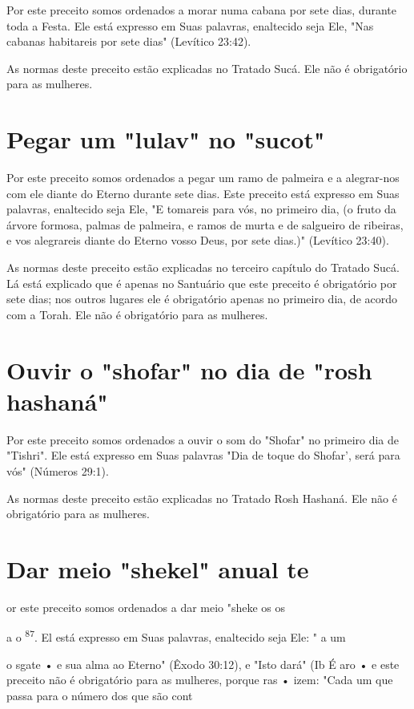 \begin{itemize}
\begin{enumrate}
\begin{itemize}
\begin{itemize}
\begin{itemize}
Por este preceito somos ordenados a morar numa cabana por sete dias,
durante toda a Festa. Ele está expresso em Suas palavras, enaltecido
seja Ele, "Nas cabanas habitareis por sete dias" (Levítico 23:42).

As normas deste preceito estão explicadas no Tratado Sucá. Ele não é
obrigatório para as mulheres.

\section{Pegar um "lulav" no "sucot"}

Por este preceito somos ordenados a pegar um ramo de palmeira e a
alegrar-nos com ele diante do Eterno durante sete dias. Este preceito
está ex­presso em Suas palavras, enaltecido seja Ele, "E tomareis para
vós, no primeiro dia, (o fruto da árvore formosa, palmas de palmeira, e
ramos de murta e de sal­gueiro de ribeiras, e vos alegrareis diante do
Eterno vosso Deus, por sete dias.)" (Levítico 23:40).

As normas deste preceito estão explicadas no terceiro capítulo do
Tratado Sucá. Lá está explicado que é apenas no Santuário que este
preceito é obrigatório por sete dias; nos outros lugares ele é
obrigatório apenas no pri­meiro dia, de acordo com a Torah. Ele não é
obrigatório para as mulheres.

\section{Ouvir o "shofar" no dia de "rosh hashaná"}

Por este preceito somos ordenados a ouvir o som do "Shofar" no primeiro
dia de "Tishri". Ele está expresso em Suas palavras "Dia de toque do
Shofar', será para vós" (Números 29:1).

As normas deste preceito estão explicadas no Tratado Rosh Hasha­ná. Ele
não é obrigatório para as mulheres.


\section{Dar meio "shekel" anual te}


or este preceito somos ordenados a dar meio "sheke os os

a o \textsuperscript{87}. El está expresso em Suas palavras, enaltecido
seja Ele: " a um

o sgate • e sua alma ao Eterno" (Êxodo 30:12), e "Isto dará" (Ib É aro •
e este preceito não é obrigatório para as mulheres, porque ras • izem:
"Cada um que passa para o número dos que são cont


\end{itemize}
\end{itemize}
\end{itemize}
\end{enumrate}
\end{itemize}
